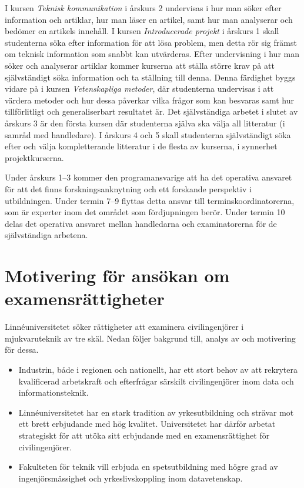 I kursen \emph{Teknisk kommunikation} i årskurs 2 undervisas i hur man söker efter information och artiklar, hur man läser en artikel, samt hur man analyserar och bedömer en artikels innehåll. I kursen \emph{Introducerade projekt} i årskurs 1 skall studenterna söka efter information för att lösa problem, men detta rör sig främst om teknisk information som snabbt kan utvärderas. Efter undervisning i hur man söker och analyserar artiklar kommer kurserna att ställa större krav på att självständigt söka information och ta ställning till denna. Denna färdighet byggs vidare på i kursen \emph{Vetenskapliga metoder}, där studenterna undervisas i att värdera metoder och hur dessa påverkar vilka frågor som kan besvaras samt hur tillförlitligt och generaliserbart resultatet är. Det självständiga arbetet i slutet av årskurs 3 är den första kursen där studenterna själva ska välja all litteratur (i samråd med handledare). I årskurs 4 och 5 skall studenterna självständigt söka efter och välja kompletterande litteratur i de flesta av kurserna, i synnerhet projektkurserna.

Under årskurs 1–3 kommer den programansvarige att ha det operativa ansvaret för att det finns forskningsanknytning och ett forskande perspektiv i utbildningen. Under termin 7–9 flyttas detta ansvar till terminskoordinatorerna, som är experter inom det området som fördjupningen berör. Under termin 10 delas det operativa ansvaret mellan handledarna och examinatorerna för de självständiga arbetena.

\section{Motivering för ansökan om examensrättigheter}

Linnéuniversitetet söker rättigheter att examinera civilingenjörer i mjukvaruteknik av tre skäl. Nedan följer bakgrund till, analys av och motivering för dessa.

\begin{itemize}
	\item Industrin, både i regionen och nationellt, har ett stort behov av att rekrytera kvalificerad arbetskraft och efterfrågar särskilt civilingenjörer inom data och informationsteknik.
	\item Linnéuniversitetet har en stark tradition av yrkesutbildning och strävar mot ett brett erbjudande med hög kvalitet. Universitetet har därför arbetat strategiskt för att utöka sitt erbjudande med en examensrättighet för civilingenjörer.
	\item Fakulteten för teknik vill erbjuda en spetsutbildning med högre grad av ingenjörsmässighet och yrkeslivskoppling inom datavetenskap.
\end{itemize}


